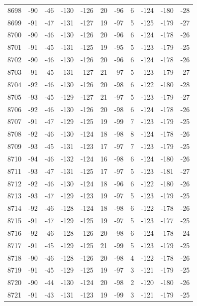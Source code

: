 \begin{table}[H]
\begin{tabular}{lllllllllll}
8698 & -90 & -46 & -130 & -126 & 20 & -96 & 6 & -124 & -180 & -28 \\
8699 & -91 & -47 & -131 & -127 & 19 & -97 & 5 & -125 & -179 & -27 \\
8700 & -90 & -46 & -130 & -126 & 20 & -96 & 6 & -124 & -178 & -26 \\
8701 & -91 & -45 & -131 & -125 & 19 & -95 & 5 & -123 & -179 & -25 \\
8702 & -90 & -46 & -130 & -126 & 20 & -96 & 6 & -124 & -178 & -26 \\
8703 & -91 & -45 & -131 & -127 & 21 & -97 & 5 & -123 & -179 & -27 \\
8704 & -92 & -46 & -130 & -126 & 20 & -98 & 6 & -122 & -180 & -28 \\
8705 & -93 & -45 & -129 & -127 & 21 & -97 & 5 & -123 & -179 & -27 \\
8706 & -92 & -46 & -130 & -126 & 20 & -98 & 6 & -124 & -178 & -26 \\
8707 & -91 & -47 & -129 & -125 & 19 & -99 & 7 & -123 & -179 & -25 \\
8708 & -92 & -46 & -130 & -124 & 18 & -98 & 8 & -124 & -178 & -26 \\
8709 & -93 & -45 & -131 & -123 & 17 & -97 & 7 & -123 & -179 & -25 \\
8710 & -94 & -46 & -132 & -124 & 16 & -98 & 6 & -124 & -180 & -26 \\
8711 & -93 & -47 & -131 & -125 & 17 & -97 & 5 & -123 & -181 & -27 \\
8712 & -92 & -46 & -130 & -124 & 18 & -96 & 6 & -122 & -180 & -26 \\
8713 & -93 & -47 & -129 & -123 & 19 & -97 & 5 & -123 & -179 & -25 \\
8714 & -92 & -46 & -128 & -124 & 18 & -98 & 6 & -122 & -178 & -26 \\
8715 & -91 & -47 & -129 & -125 & 19 & -97 & 5 & -123 & -177 & -25 \\
8716 & -92 & -46 & -128 & -126 & 20 & -98 & 6 & -124 & -178 & -24 \\
8717 & -91 & -45 & -129 & -125 & 21 & -99 & 5 & -123 & -179 & -25 \\
8718 & -90 & -46 & -128 & -126 & 20 & -98 & 4 & -122 & -178 & -26 \\
8719 & -91 & -45 & -129 & -125 & 19 & -97 & 3 & -121 & -179 & -25 \\
8720 & -90 & -44 & -130 & -124 & 20 & -98 & 2 & -120 & -180 & -26 \\
8721 & -91 & -43 & -131 & -123 & 19 & -99 & 3 & -121 & -179 & -25 \\

\end{tabular}
\end{table}
